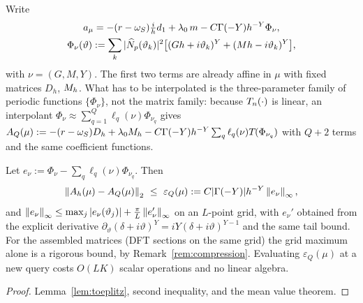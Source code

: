 Write
\begin{equation}
\begin{gathered}
 a_\mu=-(r-\omega_S)\tfrac{i}{h}d_1+\lambda_0\,m-C\Gamma(-Y)h^{-Y}\Phi_{\nu},\\
 \Phi_\nu(\vartheta):=\sum_k|\widehat N_p(\vartheta_k)|^2\bigl[(Gh+i\vartheta_k)^Y+(Mh-i\vartheta_k)^Y\bigr],
\end{gathered}
 \label{eq:affine-split}
\end{equation}
with $\nu=(G,M,Y)$.  The first two terms are already affine in $\mu$ with
fixed matrices $D_h$, $M_h$.  What has to be interpolated is the
three-parameter family of periodic functions $\{\Phi_\nu\}$, not the
matrix family: because $T_{n}(\cdot)$ is linear, an interpolant
$\Phi_\nu\approx\sum_{q=1}^Q\ell_q(\nu)\Phi_{\nu_q}$ gives
$A_Q(\mu):=-(r-\omega_S)D_h+\lambda_0M_h-C\Gamma(-Y)h^{-Y}\sum_q\ell_q(\nu)T_{}(\Phi_{\nu_q})$
with $Q+2$ terms and the same coefficient functions.
\begin{lemma}\label{lem:eim}
Let $e_\nu:=\Phi_\nu-\sum_q\ell_q(\nu)\Phi_{\nu_q}$.  Then
\[
 \norm{\Ah(\mu)-A_Q(\mu)}_2\ \le\ \varepsilon_Q(\mu):=C|\Gamma(-Y)|h^{-Y}\norm{e_\nu}_\infty,
\]
and $\left\lVert e_\nu\right\rVert_\infty\le\max_{j}|e_\nu(\vartheta_j)|+\tfrac{\pi}{L}\left\lVert e_\nu'\right\rVert_\infty$
on an $L$-point grid, with $e_\nu'$ obtained from the explicit derivative
$\partial_\vartheta(\delta+i\vartheta)^Y=iY(\delta+i\vartheta)^{Y-1}$ and the
same tail bound.  For the assembled matrices (DFT sections on the same grid) the grid maximum
alone is a rigorous bound, by Remark~\ref{rem:compression}.  Evaluating $\varepsilon_Q(\mu)$ at
a new query costs $O(LK)$ scalar operations and no linear algebra.
\end{lemma}
\begin{proof}
Lemma~\ref{lem:toeplitz}, second inequality, and the mean value theorem.
\end{proof}
